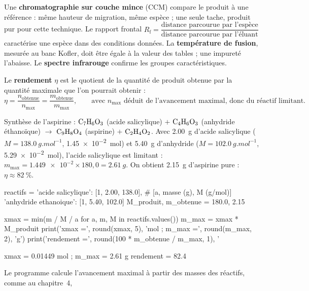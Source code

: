\begin{propriete}
Une \textbf{chromatographie sur couche mince} (CCM) compare le produit à une référence : même hauteur de migration, même
espèce ; une seule tache, produit pur pour cette technique. Le rapport frontal $R_\mathrm{f}=\dfrac{\text{distance parcourue par l'espèce}}{\text{distance parcourue par l'éluant}}$
caractérise une espèce dans des conditions données. La \textbf{température de fusion}, mesurée au banc Kofler, doit être
égale à la valeur des tables ; une impureté l'abaisse. Le \textbf{spectre infrarouge} confirme les groupes caractéristiques.
\end{propriete}
\begin{definition}
Le \textbf{rendement} $\eta$ est le quotient de la quantité de produit obtenue par la quantité maximale que l'on pourrait obtenir :
\[\eta=\frac{n_\text{obtenue}}{n_\text{max}}=\frac{m_\text{obtenue}}{m_\text{max}},\qquad\text{avec } n_\text{max}\text{ déduit de l'avancement maximal, donc du réactif limitant.}\]
\end{definition}
\begin{exemple}
Synthèse de l'aspirine : $\ce{C7H6O3}$ (acide salicylique) $+$ $\ce{C4H6O3}$ (anhydride éthanoïque) $\longrightarrow$ $\ce{C9H8O4}$ (aspirine) $+$ $\ce{C2H4O2}$.
Avec \qty{2,00}{g} d'acide salicylique ($M=\qty{138,0}{g.mol^{-1}}$, \qty{1,45e-2}{mol}) et \qty{5,40}{g} d'anhydride ($M=\qty{102,0}{g.mol^{-1}}$, \qty{5,29e-2}{mol}),
l'acide salicylique est limitant : $m_\text{max}=\num{1.449e-2}\times180{,}0=\qty{2,61}{g}$. On obtient \qty{2,15}{g} d'aspirine pure : $\eta\approx\qty{82}{\percent}$.
\end{exemple}
\begin{python}
reactifs = {'acide salicylique': [1, 2.00, 138.0],      # [a, masse (g), M (g/mol)]
            'anhydride ethanoique': [1, 5.40, 102.0]}
M_produit, m_obtenue = 180.0, 2.15

xmax = min(m / M / a for a, m, M in reactifs.values())
m_max = xmax * M_produit
print('xmax =', round(xmax, 5), 'mol ; m_max =', round(m_max, 2), 'g')
print('rendement =', round(100 * m_obtenue / m_max, 1), '%
\end{python}
\begin{console}
xmax = 0.01449 mol ; m_max = 2.61 g
rendement = 82.4 %
\end{console}
\noindent{} Le programme calcule l'avancement maximal à partir des masses des réactifs, comme au chapitre~4,
